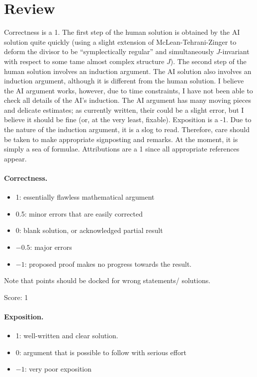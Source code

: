 \documentclass[11pt]{article}
\theoremstyle{remark}
\begin{document}
\maketitle

\section{Review}
Correctness is a 1. The first step of the human solution is obtained by the AI solution quite quickly (using a slight extension of McLean-Tehrani-Zinger to deform the divisor to be ``symplectically regular'' and simultaneously $J$-invariant with respect to some tame almost complex structure $J$). The second step of the human solution involves an induction argument. The AI solution also involves an induction argument, although it is different from the human solution. I believe the AI argument works, however, due to time constraints, I have not been able to check all details of the AI's induction. The AI argument has many moving pieces and delicate estimates; as currently written, their could be a slight error, but I believe it should be fine (or, at the very least, fixable). Exposition is a -1. Due to the nature of the induction argument, it is a slog to read. Therefore, care should be taken to make appropriate signposting and remarks. At the moment, it is simply a sea of formulae. Attributions are a 1 since all appropriate references appear.

\paragraph{Correctness.}
\begin{itemize}
	\item  1: essentially flawless mathematical argument
	\item  0.5: minor errors that are easily corrected
	\item  0: blank solution, or acknowledged partial result
	\item  $-0.5$: major errors
	\item  $-1$: proposed proof makes no progress towards the result.
\end{itemize}
Note that points should be docked for wrong statements/ solutions.

\noindent Score: 1

\paragraph{Exposition.}
\begin{itemize}
	\item  1: well-written and clear solution.
	\item  0: argument that is possible to follow with serious effort
	\item  $-1$: very poor exposition
\end{itemize}
\end{document}
